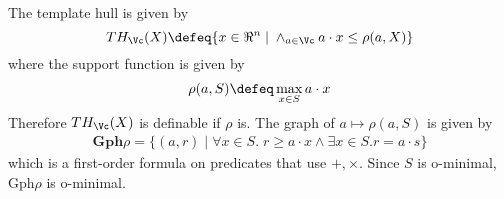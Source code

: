 \begin{prf}
The template hull is given by
\[TH_\Vc(X) \defeq \{x\in\Re^n \;|\;\land_{a \in \Vc} a\cdot x \leq \rho(a,X)\}\]
where the support function is given by 
\begin{equation}
\label{eq:supportfnt}
\rho(a,S) \defeq \max_{x \in S} a\cdot x
\end{equation}
Therefore $TH_\Vc(X)$ is definable if $\rho$ is.
The graph of $a \mapsto \rho(a,S)$ is given by 
\begin{eqnarray}
\textbf{Gph}\rho = \{(a,r) \;|\; \forall x\in S.\; r\geq a\cdot x \land \exists x\in S. r=a\cdot s\}
\end{eqnarray}
which is a first-order formula on predicates that use $+,\times$.
Since $S$ is o-minimal, Gph$\rho$ is o-minimal.
%
%
%
%
	\end{prf}